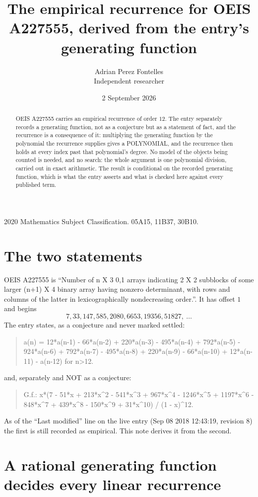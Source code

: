 \documentclass[11pt,a4paper]{article}
\title{The empirical recurrence for OEIS A227555, derived from the entry's generating function}
\author{Adrian Perez Fontelles\\ \small Independent researcher}
\date{2 September 2026}
\theoremstyle{plain}
\theoremstyle{definition}
\begin{document}
\maketitle

\begin{abstract}
OEIS A227555 carries an empirical recurrence of order $12$. The entry separately records a
generating function, not as a conjecture but as a statement of fact, and the recurrence is a
consequence of it: multiplying the generating function by the polynomial the recurrence
supplies gives a POLYNOMIAL, and the recurrence then holds at every index past that
polynomial's degree. No model of the objects being counted is needed, and no search: the
whole argument is one polynomial division, carried out in exact arithmetic. The result is
conditional on the recorded generating function, which is what the entry asserts and what is
checked here against every published term.
\end{abstract}

\noindent\small 2020 Mathematics Subject Classification. 05A15, 11B37, 30B10.\normalsize

\section{The two statements}

OEIS A227555 is ``Number of n X 3 0,1 arrays indicating 2 X 2 subblocks of some larger (n+1) X 4 binary array having nonzero determinant, with rows and columns of the latter in lexicographically nondecreasing order.''. It has offset $1$ and begins
\[
7, 33, 147, 585, 2080, 6653, 19356, 51827,\ \dots
\]
The entry states, as a conjecture and never marked settled:
\begin{quote}
a(n) = 12*a(n-1) - 66*a(n-2) + 220*a(n-3) - 495*a(n-4) + 792*a(n-5) - 924*a(n-6) + 792*a(n-7) - 495*a(n-8) + 220*a(n-9) - 66*a(n-10) + 12*a(n-11) - a(n-12) for n>12.
\end{quote}
and, separately and NOT as a conjecture:
\begin{quote}
G.f.: x*(7 - 51*x + 213*x\^{}2 - 541*x\^{}3 + 967*x\^{}4 - 1246*x\^{}5 + 1197*x\^{}6 - 848*x\^{}7 + 439*x\^{}8 - 150*x\^{}9 + 31*x\^{}10) / (1 - x)\^{}12.
\end{quote}
As of the ``Last modified'' line on the live entry (Sep 08 2018 12:43:19, revision 8) the first is still
recorded as empirical. This note derives it from the second.

\section{A rational generating function decides every linear recurrence}
\end{document}
